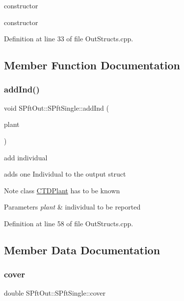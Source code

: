 constructor 

constructor 

Definition at line 33 of file Out\+Structs.\+cpp.



\subsection{Member Function Documentation}
\mbox{\label{struct_s_pft_out_1_1_s_pft_single_ad6ef86bf03a08bd7dee1583f80d57e2c}} 
\subsubsection{\texorpdfstring{addInd()}{addInd()}}
{\footnotesize\ttfamily void S\+Pft\+Out\+::\+S\+Pft\+Single\+::add\+Ind (\begin{DoxyParamCaption}\item[{\mbox{\hyperlink{class_c_plant}{C\+Plant}} $\ast$}]{plant }\end{DoxyParamCaption})}



add individual 

adds one Individual to the output struct \begin{DoxyNote}{Note}
class \mbox{\hyperlink{class_c_t_d_plant}{C\+T\+D\+Plant}} has to be known 
\end{DoxyNote}

\begin{DoxyParams}{Parameters}
{\em plant} & individual to be reported \\
\hline
\end{DoxyParams}


Definition at line 58 of file Out\+Structs.\+cpp.



\subsection{Member Data Documentation}
\mbox{\label{struct_s_pft_out_1_1_s_pft_single_a3b33b0e884d50c8c24d7c9002d54c0e8}} 
\subsubsection{\texorpdfstring{cover}{cover}}
{\footnotesize\ttfamily double S\+Pft\+Out\+::\+S\+Pft\+Single\+::cover}



